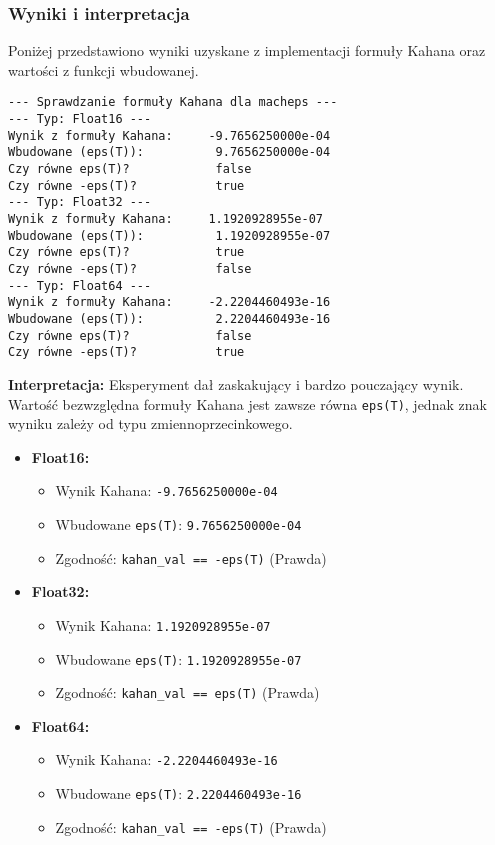 \documentclass[12pt,a4paper]{article}
\begin{document}
\subsubsection{Wyniki i interpretacja}
Poniżej przedstawiono wyniki uzyskane z implementacji formuły Kahana oraz wartości z funkcji wbudowanej.
\begin{verbatim}
--- Sprawdzanie formuły Kahana dla macheps ---
--- Typ: Float16 ---
Wynik z formuły Kahana:     -9.7656250000e-04
Wbudowane (eps(T)):          9.7656250000e-04
Czy równe eps(T)?            false
Czy równe -eps(T)?           true
--- Typ: Float32 ---
Wynik z formuły Kahana:     1.1920928955e-07
Wbudowane (eps(T)):          1.1920928955e-07
Czy równe eps(T)?            true
Czy równe -eps(T)?           false
--- Typ: Float64 ---
Wynik z formuły Kahana:     -2.2204460493e-16
Wbudowane (eps(T)):          2.2204460493e-16
Czy równe eps(T)?            false
Czy równe -eps(T)?           true
\end{verbatim}

\noindent \textbf{Interpretacja:}
Eksperyment dał zaskakujący i bardzo pouczający wynik. Wartość bezwzględna formuły Kahana jest zawsze równa \texttt{eps(T)}, jednak znak wyniku zależy od typu zmiennoprzecinkowego.

\begin{minipage}{\textwidth} %
\begin{itemize}
    \item \textbf{Float16:}
    \begin{itemize}
        \item Wynik Kahana: \texttt{-9.7656250000e-04}
        \item Wbudowane \texttt{eps(T)}: \texttt{9.7656250000e-04}
        \item Zgodność: \texttt{kahan\_val == -eps(T)} (Prawda)
    \end{itemize}
    \item \textbf{Float32:}
    \begin{itemize}
        \item Wynik Kahana: \texttt{1.1920928955e-07}
        \item Wbudowane \texttt{eps(T)}: \texttt{1.1920928955e-07}
        \item Zgodność: \texttt{kahan\_val == eps(T)} (Prawda)
    \end{itemize}
    \item \textbf{Float64:}
    \begin{itemize}
        \item Wynik Kahana: \texttt{-2.2204460493e-16}
        \item Wbudowane \texttt{eps(T)}: \texttt{2.2204460493e-16}
        \item Zgodność: \texttt{kahan\_val == -eps(T)} (Prawda)
    \end{itemize}
\end{itemize}
\end{minipage} %
\end{document}

